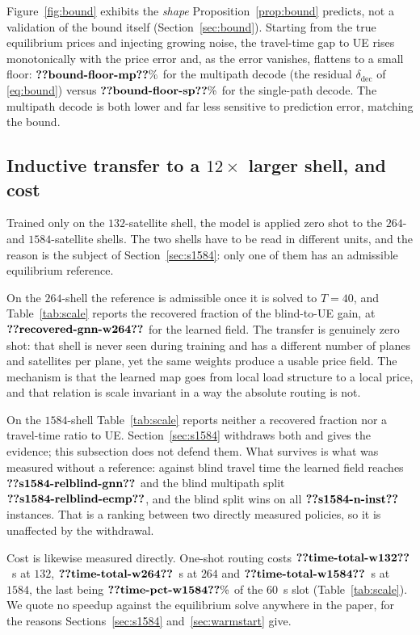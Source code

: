 \documentclass[journal]{IEEEtran}
\begin{document}


Figure~\ref{fig:bound} exhibits the \emph{shape} Proposition~\ref{prop:bound}
predicts, not a validation of the bound itself (Section~\ref{sec:bound}). Starting from the true
equilibrium prices and injecting growing noise, the travel-time gap to UE rises
monotonically with the price error and, as the error vanishes, flattens to a small floor:
$\clm{bound-floor-mp}\%$ for the multipath decode (the residual $\delta_{\mathrm{dec}}$ of
\eqref{eq:bound}) versus $\clm{bound-floor-sp}\%$ for the single-path decode. The multipath decode is
both lower and far less sensitive to prediction error, matching the bound.



\subsection{Inductive transfer to a $12\times$ larger shell, and cost}\label{sec:c2}
Trained only on the $132$-satellite shell, the model is applied zero shot to the
$264$- and $1584$-satellite shells. The two shells have to be read in different units, and
the reason is the subject of Section~\ref{sec:s1584}: only one of them has an admissible
equilibrium reference.

On the $264$-shell the reference is admissible once it is solved to $T\!=\!40$, and
Table~\ref{tab:scale} reports the recovered fraction of the blind-to-UE gain, at
$\clm{recovered-gnn-w264}$ for the learned field. The transfer is genuinely zero shot: that
shell is never seen during training and has a different number of planes and satellites per
plane, yet the same weights produce a usable price field. The mechanism is that the learned
map goes from local load structure to a local price, and that relation is scale invariant in
a way the absolute routing is not.

On the $1584$-shell Table~\ref{tab:scale} reports neither a recovered fraction nor a
travel-time ratio to UE. Section~\ref{sec:s1584} withdraws both and gives the evidence; this
subsection does not defend them. What survives is what was measured without a reference:
against blind travel time the learned field reaches $\clm{s1584-relblind-gnn}$ and the blind
multipath split $\clm{s1584-relblind-ecmp}$, and the blind split wins on all
$\clm{s1584-n-inst}$ instances. That is a ranking between two directly measured policies, so
it is unaffected by the withdrawal.

Cost is likewise measured directly. One-shot routing costs $\clm{time-total-w132}$~s at $132$, $\clm{time-total-w264}$~s at
$264$ and $\clm{time-total-w1584}$~s at $1584$, the last being $\clm{time-pct-w1584}\%$ of the $60$~s slot
(Table~\ref{tab:scale}). We quote no speedup against the equilibrium solve anywhere in the
paper, for the reasons Sections~\ref{sec:s1584} and~\ref{sec:warmstart} give.
\end{document}
